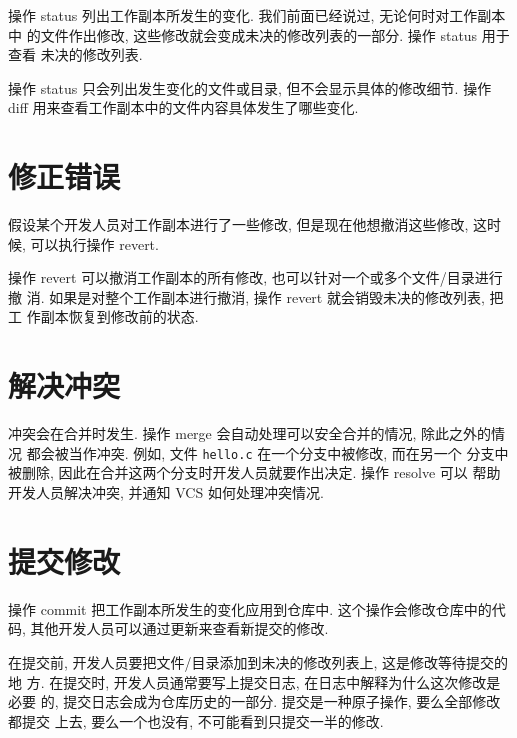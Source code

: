 \documentclass[nofonts, oneside]{ctexbook}
\begin{document}
操作 status 列出工作副本所发生的变化. 我们前面已经说过, 无论何时对工作副本中
的文件作出修改, 这些修改就会变成未决的修改列表的一部分. 操作 status 用于查看
未决的修改列表.

操作 status 只会列出发生变化的文件或目录, 但不会显示具体的修改细节. 操作
diff 用来查看工作副本中的文件内容具体发生了哪些变化.

\section{修正错误}
\label{sec:fix_mistakes}

假设某个开发人员对工作副本进行了一些修改, 但是现在他想撤消这些修改, 这时候,
可以执行操作 revert.

操作 revert 可以撤消工作副本的所有修改, 也可以针对一个或多个文件/目录进行撤
消. 如果是对整个工作副本进行撤消, 操作 revert 就会销毁未决的修改列表, 把工
作副本恢复到修改前的状态.

\section{解决冲突}
\label{sec:resolve_conflicts}

冲突会在合并时发生. 操作 merge 会自动处理可以安全合并的情况, 除此之外的情况
都会被当作冲突. 例如, 文件 \texttt{hello.c} 在一个分支中被修改, 而在另一个
分支中被删除, 因此在合并这两个分支时开发人员就要作出决定. 操作 resolve 可以
帮助开发人员解决冲突, 并通知 VCS 如何处理冲突情况.

\section{提交修改}
\label{sec:commit_changes}

操作 commit 把工作副本所发生的变化应用到仓库中. 这个操作会修改仓库中的代码,
其他开发人员可以通过更新来查看新提交的修改.

在提交前, 开发人员要把文件/目录添加到未决的修改列表上, 这是修改等待提交的地
方. 在提交时, 开发人员通常要写上提交日志, 在日志中解释为什么这次修改是必要
的, 提交日志会成为仓库历史的一部分. 提交是一种原子操作, 要么全部修改都提交
上去, 要么一个也没有, 不可能看到只提交一半的修改.

\printindex
\end{document}
